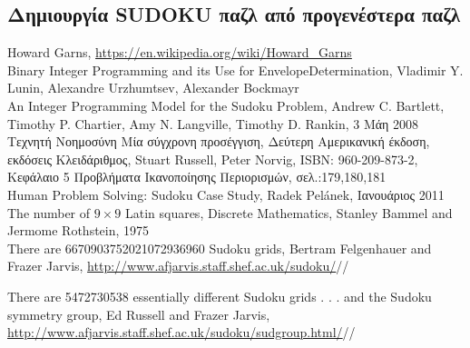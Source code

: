 \documentclass[12pt]{book}
\theoremstyle{definition}
\begin{document}
\subsection{Δημιουργία SUDOKU παζλ από προγενέστερα παζλ}

\pagebreak

\begin{thebibliography}{99}
	Howard Garns, 
	\url{https://en.wikipedia.org/wiki/Howard_Garns} \\
	
	Binary Integer Programming and its Use for EnvelopeDetermination,
	Vladimir Y. Lunin, Alexandre Urzhumtsev, Alexander Bockmayr \\
	
	An Integer Programming Model for the Sudoku Problem,
	Andrew C. Bartlett,	Timothy P. Chartier, Amy N. Langville, Timothy D. Rankin,
	3 Μάη 2008 \\
	
	Τεχνητή Νοημοσύνη Μία σύγχρονη προσέγγιση, Δεύτερη Αμερικανική έκδοση, εκδόσεις Κλειδάριθμος,
	Stuart Russell, Peter Norvig,
	ISBN: 960-209-873-2,
	Κεφάλαιο 5 Προβλήματα Ικανοποίησης Περιορισμών, σελ.:179,180,181 \\
	
	Human Problem Solving: Sudoku Case Study,
	Radek Pelánek,
	Ιανουάριος 2011 \\

	The number of \(9 \times 9\) Latin squares, Discrete Mathematics,
	Stanley Bammel and Jermome Rothstein,
	1975 \\

	There are 6670903752021072936960 Sudoku grids,
	Bertram Felgenhauer and Frazer Jarvis,
	\url{ http://www.afjarvis.staff.shef.ac.uk/sudoku/}//

	There are 5472730538 essentially different Sudoku grids . . . and the
Sudoku symmetry group,
	Ed Russell and Frazer Jarvis,
	\url{ http://www.afjarvis.staff.shef.ac.uk/sudoku/sudgroup.html/}//

\end{thebibliography}
\end{document}
